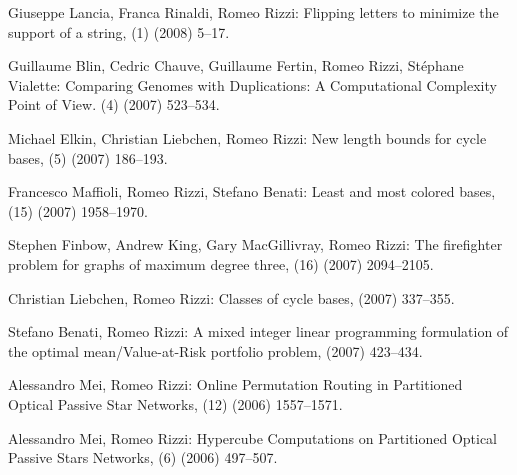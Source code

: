 \begin{etaremune}
  \item {\sc Giuseppe Lancia, Franca Rinaldi, Romeo Rizzi:}
   \newblock  Flipping letters to minimize the support of a string,
   (1) (2008) 5--17.

  \item {\sc Guillaume Blin, Cedric Chauve, Guillaume Fertin, Romeo Rizzi, St\'ephane Vialette:}
   \newblock  Comparing Genomes with Duplications: A Computational Complexity Point of View.
   (4) (2007) 523--534.

  \item {\sc Michael Elkin, Christian Liebchen, Romeo Rizzi:}
   \newblock  New length bounds for cycle bases,
   (5) (2007) 186--193.

  \item {\sc Francesco Maffioli, Romeo Rizzi, Stefano Benati:}
   \newblock  Least and most colored bases,
   (15) (2007) 1958--1970.

  \item {\sc Stephen Finbow, Andrew King, Gary MacGillivray, Romeo Rizzi:}
   \newblock  The firefighter problem for graphs of maximum degree three,
   (16) (2007) 2094--2105.

  \item {\sc Christian Liebchen, Romeo Rizzi:}
   \newblock  Classes of cycle bases,
    (2007) 337--355.

  \item {\sc Stefano Benati, Romeo Rizzi:}
   \newblock  A mixed integer linear programming formulation
              of the optimal mean/Value-at-Risk portfolio problem,
    (2007) 423--434.

  \item {\sc Alessandro Mei, Romeo Rizzi:}
   \newblock  Online Permutation Routing in
              Partitioned Optical Passive Star Networks,
   (12) (2006) 1557--1571.

  \item {\sc Alessandro Mei, Romeo Rizzi:}
   \newblock  Hypercube Computations on Partitioned Optical
              Passive Stars Networks,
   (6) (2006) 497--507.


\end{etaremune}
